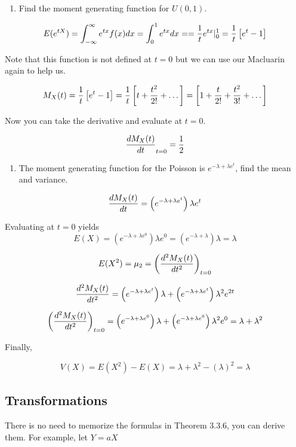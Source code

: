 \documentclass[]{book}
\providecommand{\tightlist}{%
  \setlength{\itemsep}{0pt}\setlength{\parskip}{0pt}}
\theoremstyle{definition}
\theoremstyle{definition}
\theoremstyle{definition}
\theoremstyle{remark}
\begin{document}
\begin{enumerate}
\def\labelenumi{\arabic{enumi}.}
\tightlist
\item
  Find the moment generating function for \(U(0,1)\).
\end{enumerate}

\[E(e^{tX})=\int_{-\infty}^{\infty}e^{tx}f(x)dx=\int_{0}^{1}e^{tx}dx=={1 \over t}e^{tx}\vert_{0}^{1}={1 \over t}\left[e^{t}-1\right]\]

Note that this function is not defined at \(t=0\) but we can use our
Macluarin again to help us.

\[M_{X}(t)={1 \over t}\left[e^{t}-1\right]={1 \over t}\left[t+{t^2 \over 2!}+\dots \right]=\left[1+{t \over 2!}+{t^2 \over 3!}+\dots \right]\]

Now you can take the derivative and evaluate at \(t=0\).

\[{dM_{X}(t) \over dt}_{t=0}={1 \over 2}\]

\begin{enumerate}
\def\labelenumi{\arabic{enumi}.}
\setcounter{enumi}{1}
\tightlist
\item
  The moment generating function for the Poisson is
  \(e^{-\lambda + \lambda e^{t}}\), find the mean and variance.
\end{enumerate}

\[{dM_{X}(t) \over dt}=\left(e^{-\lambda + \lambda e^{t}}\right) \lambda e^{t}\]

Evaluating at \(t=0\) yields
\[E(X)=\left(e^{-\lambda + \lambda e^{0}}\right) \lambda e^{0}=\left(e^{-\lambda + \lambda} \right) \lambda=\lambda\]

\[E(X^2)=\mu_{2}=\left(  {d^{2}M_{X}(t) \over dt^{2}} \right) _{t=0}\]

\[{d^{2}M_{X}(t) \over dt^{2}}=\left(e^{-\lambda + \lambda e^{t}}\right) \lambda + \left(e^{-\lambda + \lambda e^{t}}\right) \lambda^2 e^{2t}\]

\[\left(  {d^{2}M_{X}(t) \over dt^{2}} \right) _{t=0}=\left(e^{-\lambda + \lambda e^{0}}\right) \lambda + \left(e^{-\lambda + \lambda e^{0}}\right) \lambda^2 e^{0}=\lambda +\lambda^2\]

Finally,

\[V(X)=E(X^2)-E(X)=\lambda +\lambda^2-(\lambda)^2=\lambda\]

\subsection{Transformations}\label{transformations}

There is no need to memorize the formulas in Theorem 3.3.6, you can
derive them. For example, let \(Y=aX\)
\end{document}
